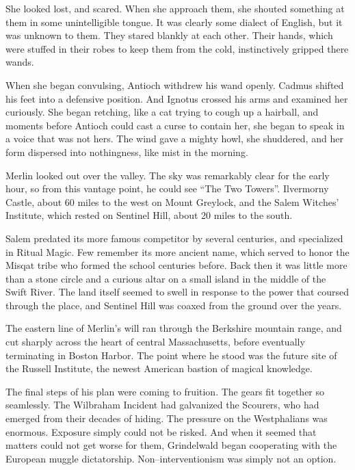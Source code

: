 She looked lost, and scared. When she approach them, she shouted something at them in some unintelligible tongue. It was clearly some dialect of English, but it was unknown to them. They stared blankly at each other. Their hands, which were stuffed in their robes to keep them from the cold, instinctively gripped there wands.

When she began convulsing, Antioch withdrew his wand openly. Cadmus shifted his feet into a defensive position. And Ignotus crossed his arms and examined her curiously. She began retching, like a cat trying to cough up a hairball, and moments before Antioch could cast a curse to contain her, she began to speak in a voice that was not hers.
\SmallVSpace
{}
\SmallVSpace
The wind gave a mighty howl, she shuddered, and her form dispersed into nothingness, like mist in the morning.

\simpleline


Merlin looked out over the valley. The sky was remarkably clear for the early hour, so from this vantage point, he could see “The Two Towers”. Ilvermorny Castle, about 60 miles to the west on Mount Greylock, and the Salem Witches’ Institute, which rested on Sentinel Hill, about 20 miles to the south.

Salem predated its more famous competitor by several centuries, and specialized in Ritual Magic. Few remember its more ancient name, which served to honor the Misqat tribe who formed the school centuries before. Back then it was little more than a stone circle and a curious altar on a small island in the middle of the Swift River. The land itself seemed to swell in response to the power that coursed through the place, and Sentinel Hill was coaxed from the ground over the years.

The eastern line of Merlin’s will ran through the Berkshire mountain range, and cut sharply across the heart of central Massachusetts, before eventually terminating in Boston Harbor. The point where he stood was the future site of the Russell Institute, the newest American bastion of magical knowledge.

The final steps of his plan were coming to fruition. The gears fit together so seamlessly. The Wilbraham Incident had galvanized the Scourers, who had emerged from their decades of hiding. The pressure on the Westphalians was enormous. Exposure simply could not be risked. And when it seemed that matters could not get worse for them, Grindelwald began cooperating with the European muggle dictatorship. Non\mbox{--}interventionism was simply not an option.


